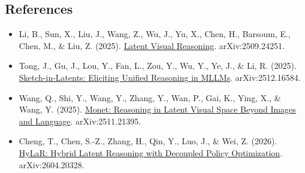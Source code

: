 \FloatBarrier
{}
\hypertarget{references-148}{%
\subsection{References}\label{references-148}}

\vspace{0.25em}
\begin{itemize}
\tightlist
\item
  Li, B., Sun, X., Liu, J., Wang, Z., Wu, J., Yu, X., Chen, H., Barsoum, E., Chen, M., \& Liu, Z. (2025). \href{https://arxiv.org/abs/2509.24251}{Latent Visual Reasoning}. arXiv:2509.24251.
\item
  Tong, J., Gu, J., Lou, Y., Fan, L., Zou, Y., Wu, Y., Ye, J., \& Li, R. (2025). \href{https://arxiv.org/abs/2512.16584}{Sketch-in-Latents: Eliciting Unified Reasoning in MLLMs}. arXiv:2512.16584.
\item
  Wang, Q., Shi, Y., Wang, Y., Zhang, Y., Wan, P., Gai, K., Ying, X., \& Wang, Y. (2025). \href{https://arxiv.org/abs/2511.21395}{Monet: Reasoning in Latent Visual Space Beyond Images and Language}. arXiv:2511.21395.
\item
  Cheng, T., Chen, S.-Z., Zhang, H., Qin, Y., Luo, J., \& Wei, Z. (2026). \href{https://arxiv.org/abs/2604.20328}{HyLaR: Hybrid Latent Reasoning with Decoupled Policy Optimization}. arXiv:2604.20328.
\end{itemize}

\clearpage
